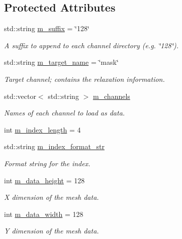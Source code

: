 \subsection*{Protected Attributes}
\begin{DoxyCompactItemize}
\item 
std\+::string \hyperlink{classlbann_1_1mesh__reader_aefadeb4ee1b9202dcadb4625da21c451}{m\+\_\+suffix} = \char`\"{}128\char`\"{}
\begin{DoxyCompactList}\small\item\em A suffix to append to each channel directory (e.\+g. \char`\"{}128\char`\"{}). \end{DoxyCompactList}\item 
std\+::string \hyperlink{classlbann_1_1mesh__reader_a838ab7976ce9e3d85e727159a7d4720c}{m\+\_\+target\+\_\+name} = \char`\"{}mask\char`\"{}
\begin{DoxyCompactList}\small\item\em Target channel; contains the relaxation information. \end{DoxyCompactList}\item 
std\+::vector$<$ std\+::string $>$ \hyperlink{classlbann_1_1mesh__reader_a9260add45b0421acb0ab28dd8f6d8cc6}{m\+\_\+channels}
\begin{DoxyCompactList}\small\item\em Names of each channel to load as data. \end{DoxyCompactList}\item 
int \hyperlink{classlbann_1_1mesh__reader_a43c1aec4b0f635f6f7bf52944ace1883}{m\+\_\+index\+\_\+length} = 4
\item 
std\+::string \hyperlink{classlbann_1_1mesh__reader_ae30866c8ae510d06eb63264de35917be}{m\+\_\+index\+\_\+format\+\_\+str}
\begin{DoxyCompactList}\small\item\em Format string for the index. \end{DoxyCompactList}\item 
int \hyperlink{classlbann_1_1mesh__reader_aeb4e0df4e0be56244df5b663e2940d11}{m\+\_\+data\+\_\+height} = 128
\begin{DoxyCompactList}\small\item\em X dimension of the mesh data. \end{DoxyCompactList}\item 
int \hyperlink{classlbann_1_1mesh__reader_a8e16a565b0afd3097a0b6fe31a94641e}{m\+\_\+data\+\_\+width} = 128
\begin{DoxyCompactList}\small\item\em Y dimension of the mesh data. \end{DoxyCompactList}\item 

\end{DoxyCompactItemize}
